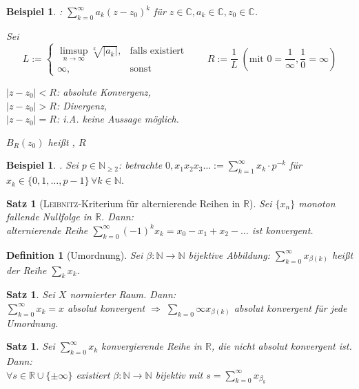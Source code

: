 \documentclass[ngerman,a4paper]{report}
\theoremstyle{break}
\newtheorem{example}[theorem]{Beispiel}
\newtheorem{satz}[theorem]{Satz}
\newtheorem*{definition}{Definition}
\newcommand{\person}[1]{\textsc{#1}}
\begin{document}
\begin{example}
	: $\sum_{k=0}^\infty a_k(z-z_0)^k$ für $z\in\mathbb{C}, a_k\in\mathbb{C}, z_0\in\mathbb{C}$.
	
	Sei \[L:=\begin{cases} \limsup\limits_{n\rightarrow\infty} \sqrt[k]{|a_k|},&\text{falls existiert}\\ \infty,&\text{sonst}\end{cases}\qquad R:=\frac{1}{L} \;(\text{mit }0 = \frac{1}{\infty}, \frac{1}{0} = \infty)\]
	
	$ |z - z_0| < R$: absolute Konvergenz,\\
	$|z-z_0| > R$: Divergenz,\\
	$|z-z_0| = R$: i.A. keine Aussage möglich.
	
	$B_R(z_0)$ heißt , $R$ 
\end{example}
\begin{example}
	. Sei $p\in\mathbb{N}_{\ge 2}$: betrachte $0,x_1x_2x_3\dotsc :=\sum_{k=1}^\infty x_k\cdot p^{-k}$ für $x_k\in\{0,1,\dotsc,p-1\}\,\forall k\in\mathbb{N}$.
\end{example}
\begin{satz}[\person{Leibnitz}-Kriterium für alternierende Reihen in $\mathbb{R}$]
	Sei $\{x_n\}$ monoton fallende Nullfolge in $\mathbb{R}$. Dann:\\
	alternierende Reihe $\sum_{k=0}^\infty (-1)^k x_k = x_0 - x_1 + x_2 - \dotsc$ ist konvergent.
\end{satz}
\begin{definition}[Umordnung]
	Sei $\beta:\mathbb{N}\rightarrow\mathbb{N}$ bijektive Abbildung: $\sum_{k=0}^\infty x_{\beta(k)}$ heißt  der Reihe $\sum_k x_k$.
\end{definition}
\begin{satz}
	Sei $X$ normierter Raum. Dann:\\
	$\sum_{k=0}^\infty x_k = x$ absolut konvergent $\Rightarrow\;\sum_{k=0}\infty x_{\beta(k)}$ absolut konvergent für jede Umordnung.
\end{satz}
\begin{satz}
	Sei $\sum_{k=0}^\infty x_k$ konvergierende Reihe in $\mathbb{R}$, die nicht absolut konvergent ist. Dann:\\
	$\forall s\in\mathbb{R}\cup \{\pm\infty\}$ existiert $\beta:\mathbb{N}\rightarrow\mathbb{N}$ bijektiv mit $s=\sum_{k=0}^\infty x_{\beta_k}$
\end{satz}
\end{document}
